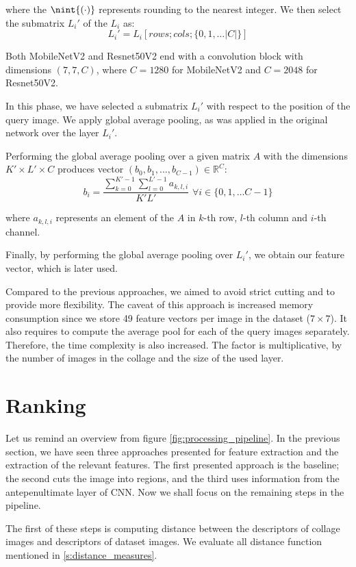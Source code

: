 where the $\nint{(\cdot)}$ represents rounding to the nearest integer. We then select the submatrix $L_i'$ of the $L_i$ as: 
$$
L_i' = L_i[rows; cols; \{0, 1, \ldots |C|\}]
$$

Both MobileNetV2 and Resnet50V2 end with a convolution block with dimensions $(7,7,C)$, where $C = 1280$ for MobileNetV2 and $C = 2048$ for Resnet50V2. 

In this phase, we have selected a submatrix $L_i'$ with respect to the position of the query image. We apply global average pooling, as was applied in the original network over the layer $L_i'$. 

Performing the global average pooling over a given matrix $A$ with the dimensions $K' \times L' \times C$ produces vector $(b_0, b_1, \ldots, b_{C-1}) \in \mathbb{R}^{C}$:
$$
    b_i = \frac{\sum_{k=0}^{K'-1} \sum_{l=0}^{L'-1} a_{k, l, i}} {K'L'} \,\, \forall i \in \{0, 1, \ldots C-1\}
$$

where $a_{k,l,i}$ represents an element of the $A$ in $k$-th row, $l$-th column and $i$-th channel.

Finally, by performing the global average pooling over $L_i'$, we obtain our feature vector, which is later used.

Compared to the previous approaches, we aimed to avoid strict cutting and to provide more flexibility. The caveat of this approach is increased memory consumption since we store 49 feature vectors per image in the dataset ($7\times7$). It also requires to compute the average pool for each of the query images separately. Therefore, the time complexity is also increased. The factor is multiplicative, by the number of images in the collage and the size of the used layer.

\section{Ranking}

Let us remind an overview from figure \ref{fig:processing_pipeline}. In the previous section, we have seen three approaches presented for feature extraction and the extraction of the relevant features. The first presented approach is the baseline; the second cuts the image into regions, and the third uses information from the antepenultimate layer of CNN. Now we shall focus on the remaining steps in the pipeline.

The first of these steps is computing distance between the descriptors of collage images and descriptors of dataset images. We  evaluate all distance function mentioned in \autoref{s:distance_measures}.

